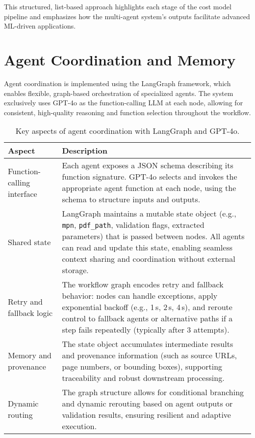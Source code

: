 This structured, list-based approach highlights each stage of the cost model pipeline and emphasizes how the multi-agent system's outputs facilitate advanced ML-driven applications.

\section{Agent Coordination and Memory}
Agent coordination is implemented using the LangGraph framework, which enables flexible, graph-based orchestration of specialized agents. The system exclusively uses GPT-4o as the function-calling LLM at each node, allowing for consistent, high-quality reasoning and function selection throughout the workflow.

\begin{table}[H]
  \centering
  \caption{Key aspects of agent coordination with LangGraph and GPT-4o.}
  \begin{tabular}{p{3.5cm} p{10cm}}
    \hline
    \textbf{Aspect} & \textbf{Description} \\
    \hline
    Function-calling interface & Each agent exposes a JSON schema describing its function signature. GPT-4o selects and invokes the appropriate agent function at each node, using the schema to structure inputs and outputs. \\
    Shared state & LangGraph maintains a mutable state object (e.g., \verb|mpn|, \verb|pdf_path|, validation flags, extracted parameters) that is passed between nodes. All agents can read and update this state, enabling seamless context sharing and coordination without external storage. \\
    Retry and fallback logic & The workflow graph encodes retry and fallback behavior: nodes can handle exceptions, apply exponential backoff (e.g., 1\,s, 2\,s, 4\,s), and reroute control to fallback agents or alternative paths if a step fails repeatedly (typically after 3 attempts). \\
    Memory and provenance & The state object accumulates intermediate results and provenance information (such as source URLs, page numbers, or bounding boxes), supporting traceability and robust downstream processing. \\
    Dynamic routing & The graph structure allows for conditional branching and dynamic rerouting based on agent outputs or validation results, ensuring resilient and adaptive execution. \\
    \hline
  \end{tabular}
\end{table}

